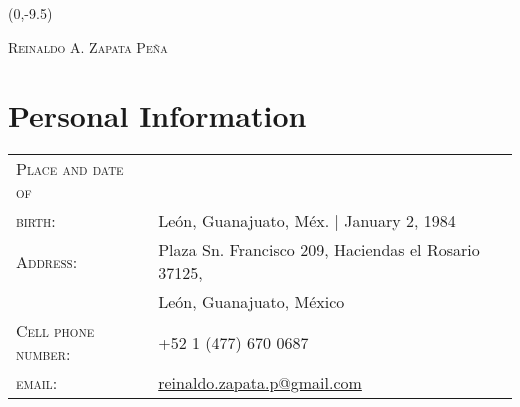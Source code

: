 \documentclass[letterpaper,10pt]{article}
\begin{document}
\begin{textblock}{1}(0,-9.5)
\end{textblock}

\begin{center}
{\Huge \textsc{Reinaldo A. Zapata Pe\~na}}\\[5pt]
{\Large\color{headings}}
\end{center}

\section{Personal Information}
\begin{tabular}{R{4cm}l}
\textsc{Place and date of}  &   \\
\textsc{birth:}             &   Le\'on, Guanajuato, M\'ex. |  January 2, 1984 \\
\textsc{Address:}           &   Plaza Sn. Francisco 209, Haciendas el Rosario 37125, \\
                            &   Le\'on, Guanajuato, M\'exico \\
\textsc{Cell phone number:} &   +52 1 (477) 670 0687\\
\textsc{email:}             &   \href{mailto:reinaldo.zapata.p@gmail.com}{reinaldo.zapata.p@gmail.com}
\end{tabular}
\end{document}
